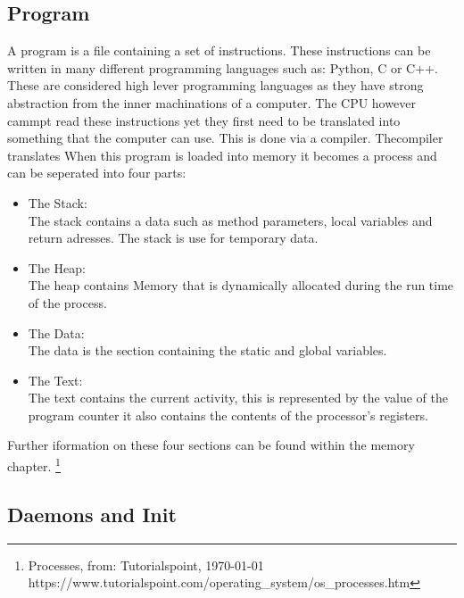 \subsection{Program}

A program is a file containing a set of instructions. These instructions can be written in many different 
programming languages such as: Python, C or C++. These are considered high lever programming languages as 
they have strong abstraction from the inner machinations of a computer. The CPU however cammpt read these 
instructions yet they first need to be translated into something that the computer can use. This is done 
via a compiler. Thecompiler translates When this program is loaded into memory it becomes a process and can 
be seperated into four parts:

\begin{itemize}
\item The Stack: \\

The stack contains a data such as method parameters, local variables and return adresses. The stack is use for temporary data.
\item The Heap: \\

The heap contains Memory that is dynamically allocated during the run time of the process.
\item The Data: \\

The data is the section containing the static and global variables.
\item The Text: \\

The text contains the current activity, this is represented by the value of the program counter it also contains the contents of the processor's registers.

\end{itemize}

Further iformation on these four sections can be found within the memory chapter. \footnote{Processes, from: Tutorialspoint, \today \\ https://www.tutorialspoint.com/operating_system/os_processes.htm }


\subsection{Daemons and Init}

